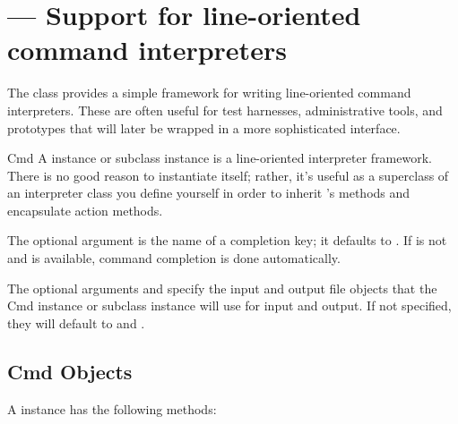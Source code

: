 \section{ ---
         Support for line-oriented command interpreters}



The  class provides a simple framework for writing
line-oriented command interpreters.  These are often useful for
test harnesses, administrative tools, and prototypes that will
later be wrapped in a more sophisticated interface.

\begin{classdesc}{Cmd}{}
A  instance or subclass instance is a line-oriented
interpreter framework.  There is no good reason to instantiate
 itself; rather, it's useful as a superclass of an
interpreter class you define yourself in order to inherit
's methods and encapsulate action methods.

The optional argument  is the  name
of a completion key; it defaults to . If  is
not  and  is available, command completion
is done automatically.

The optional arguments  and  specify the 
input and output file objects that the Cmd instance or subclass 
instance will use for input and output. If not specified, they
will default to  and .

\end{classdesc}

\subsection{Cmd Objects}
\label{Cmd-objects}

A  instance has the following methods:

